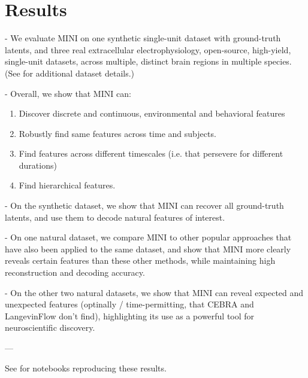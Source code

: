 \section{Results}
\label{section:results}

- We evaluate MINI on one synthetic single-unit dataset with ground-truth latents, and three real extracellular electrophysiology, open-source, high-yield, single-unit datasets, across multiple, distinct brain regions in multiple species. (See  for additional dataset details.)

- Overall, we show that MINI can:
\begin{enumerate}
    \item Discover discrete and continuous, environmental and behavioral features
    \item Robustly find same features across time and subjects.
    \item Find features across different timescales (i.e. that persevere for different durations)
    \item Find hierarchical features.
\end{enumerate}    

- On the synthetic dataset, we show that MINI can recover all ground-truth latents, and use them to decode natural features of interest.

- On one natural dataset, we compare MINI to other popular approaches that have also been applied to the same dataset, and show that MINI more clearly reveals certain features than these other methods, while maintaining high reconstruction and decoding accuracy.

- On the other two natural datasets, we show that MINI can reveal expected and unexpected features (optinally / time-permitting, that CEBRA and LangevinFlow don't find), highlighting its use as a powerful tool for neuroscientific discovery.

---








See  for notebooks reproducing these results.
